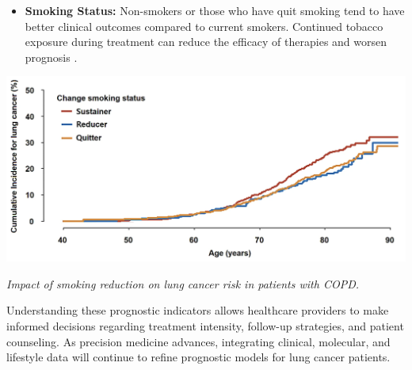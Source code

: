 \begin{itemize}
    \item \textbf{Smoking Status:} Non-smokers or those who have quit smoking tend to have better 
    clinical outcomes compared to current smokers. Continued tobacco exposure during treatment can 
    reduce the efficacy of therapies and worsen prognosis \cite{gilbert2020smoking}.
\end{itemize}

\vspace{1em}
\begin{center}
    \includegraphics[width=1.00\textwidth]{../assets/05-prognosis/smoking-clinical-outcomes.png}

    \small\textit{Impact of smoking reduction on lung cancer risk in patients with COPD. 
    \cite{shin2024impact}}
\end{center}
\vspace{1em}

Understanding these prognostic indicators allows healthcare providers to make informed decisions 
regarding treatment intensity, follow-up strategies, and patient counseling. As precision medicine 
advances, integrating clinical, molecular, and lifestyle data will continue to refine prognostic 
models for lung cancer patients.
